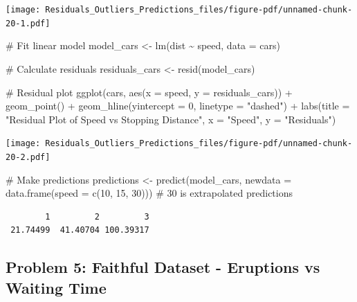 \documentclass[
  letterpaper,
  DIV=11,
  numbers=noendperiod]{scrreprt}
\newenvironment{Shaded}{\begin{snugshade}}{\end{snugshade}}
\newcommand{\AttributeTok}[1]{\textcolor[rgb]{0.40,0.45,0.13}{#1}}
\newcommand{\CommentTok}[1]{\textcolor[rgb]{0.37,0.37,0.37}{#1}}
\newcommand{\DecValTok}[1]{\textcolor[rgb]{0.68,0.00,0.00}{#1}}
\newcommand{\FunctionTok}[1]{\textcolor[rgb]{0.28,0.35,0.67}{#1}}
\newcommand{\NormalTok}[1]{\textcolor[rgb]{0.00,0.23,0.31}{#1}}
\newcommand{\OtherTok}[1]{\textcolor[rgb]{0.00,0.23,0.31}{#1}}
\newcommand{\SpecialCharTok}[1]{\textcolor[rgb]{0.37,0.37,0.37}{#1}}
\newcommand{\StringTok}[1]{\textcolor[rgb]{0.13,0.47,0.30}{#1}}
\begin{document}
\texttt{[image: Residuals\_Outliers\_Predictions\_files/figure-pdf/unnamed-chunk-20-1.pdf]}

\begin{Shaded}
\begin{Highlighting}[]
\CommentTok{\# Fit linear model}
\NormalTok{model\_cars }\OtherTok{\textless{}{-}} \FunctionTok{lm}\NormalTok{(dist }\SpecialCharTok{\textasciitilde{}}\NormalTok{ speed, }\AttributeTok{data =}\NormalTok{ cars)}

\CommentTok{\# Calculate residuals}
\NormalTok{residuals\_cars }\OtherTok{\textless{}{-}} \FunctionTok{resid}\NormalTok{(model\_cars)}

\CommentTok{\# Residual plot}
\FunctionTok{ggplot}\NormalTok{(cars, }\FunctionTok{aes}\NormalTok{(}\AttributeTok{x =}\NormalTok{ speed, }\AttributeTok{y =}\NormalTok{ residuals\_cars)) }\SpecialCharTok{+}
  \FunctionTok{geom\_point}\NormalTok{() }\SpecialCharTok{+}
  \FunctionTok{geom\_hline}\NormalTok{(}\AttributeTok{yintercept =} \DecValTok{0}\NormalTok{, }\AttributeTok{linetype =} \StringTok{"dashed"}\NormalTok{) }\SpecialCharTok{+}
  \FunctionTok{labs}\NormalTok{(}\AttributeTok{title =} \StringTok{"Residual Plot of Speed vs Stopping Distance"}\NormalTok{, }\AttributeTok{x =} \StringTok{"Speed"}\NormalTok{, }\AttributeTok{y =} \StringTok{"Residuals"}\NormalTok{)}
\end{Highlighting}
\end{Shaded}

\texttt{[image: Residuals\_Outliers\_Predictions\_files/figure-pdf/unnamed-chunk-20-2.pdf]}

\begin{Shaded}
\begin{Highlighting}[]
\CommentTok{\# Make predictions}
\NormalTok{predictions }\OtherTok{\textless{}{-}} \FunctionTok{predict}\NormalTok{(model\_cars, }\AttributeTok{newdata =} \FunctionTok{data.frame}\NormalTok{(}\AttributeTok{speed =} \FunctionTok{c}\NormalTok{(}\DecValTok{10}\NormalTok{, }\DecValTok{15}\NormalTok{, }\DecValTok{30}\NormalTok{))) }\CommentTok{\# 30 is extrapolated}
\NormalTok{predictions}
\end{Highlighting}
\end{Shaded}

\begin{verbatim}
        1         2         3 
 21.74499  41.40704 100.39317 
\end{verbatim}

\subsection*{Problem 5: Faithful Dataset - Eruptions vs Waiting
Time}\label{problem-5-faithful-dataset---eruptions-vs-waiting-time-2}
\end{document}
